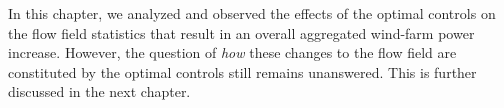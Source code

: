 In this chapter, we analyzed and observed the effects of the optimal controls on the flow field statistics that result in an overall aggregated wind-farm power increase. However, the question of \emph{how} these changes to the flow field are constituted by the optimal controls still remains unanswered. This is further discussed in the next chapter. 

\cleardoublepage
